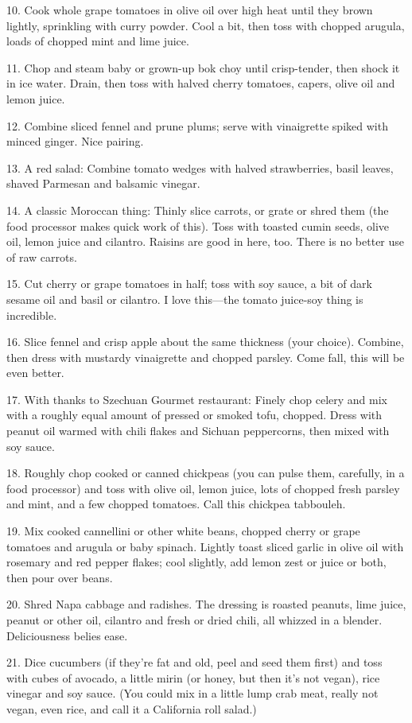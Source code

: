 \begin{recipe}
10. Cook whole grape tomatoes in olive oil over high heat until they
brown lightly, sprinkling with curry powder. Cool a bit, then toss
with chopped arugula, loads of chopped mint and lime juice.

11. Chop and steam baby or grown-up bok choy until crisp-tender, then
shock it in ice water. Drain, then toss with halved cherry tomatoes,
capers, olive oil and lemon juice.

12. Combine sliced fennel and prune plums; serve with vinaigrette
spiked with minced ginger. Nice pairing.

13. A red salad: Combine tomato wedges with halved strawberries, basil
leaves, shaved Parmesan and balsamic vinegar.

14. A classic Moroccan thing: Thinly slice carrots, or grate or shred
them (the food processor makes quick work of this). Toss with toasted
cumin seeds, olive oil, lemon juice and cilantro. Raisins are good in
here, too. There is no better use of raw carrots.

15. Cut cherry or grape tomatoes in half; toss with soy sauce, a bit
of dark sesame oil and basil or cilantro. I love this---the tomato
juice-soy thing is incredible.

16. Slice fennel and crisp apple about the same thickness (your
choice). Combine, then dress with mustardy vinaigrette and chopped
parsley. Come fall, this will be even better.

17. With thanks to Szechuan Gourmet restaurant: Finely chop celery and
mix with a roughly equal amount of pressed or smoked tofu,
chopped. Dress with peanut oil warmed with chili flakes and Sichuan
peppercorns, then mixed with soy sauce.

18. Roughly chop cooked or canned chickpeas (you can pulse them,
carefully, in a food processor) and toss with olive oil, lemon juice,
lots of chopped fresh parsley and mint, and a few chopped
tomatoes. Call this chickpea tabbouleh.

19. Mix cooked cannellini or other white beans, chopped cherry or
grape tomatoes and arugula or baby spinach. Lightly toast sliced
garlic in olive oil with rosemary and red pepper flakes; cool
slightly, add lemon zest or juice or both, then pour over beans.

20. Shred Napa cabbage and radishes. The dressing is roasted peanuts,
lime juice, peanut or other oil, cilantro and fresh or dried chili,
all whizzed in a blender. Deliciousness belies ease.

21. Dice cucumbers (if they're fat and old, peel and seed them first)
and toss with cubes of avocado, a little mirin (or honey, but then
it's not vegan), rice vinegar and soy sauce. (You could mix in a
little lump crab meat, really not vegan, even rice, and call it a
California roll salad.)


\end{recipe}
